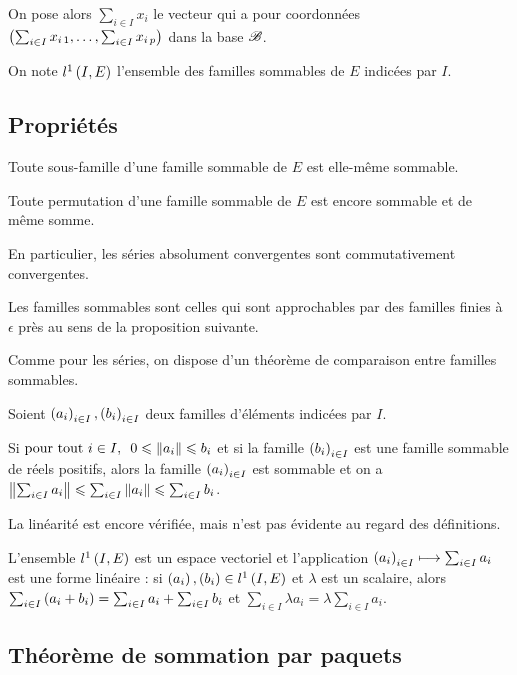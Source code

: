 On pose alors \(\sum_{i\in I}x_i\) le vecteur qui a pour coordonnées \(\left(\sum_{i\in I}x_{i\,1},\dots,\sum_{i\in I}x_{i\,p}\right)\) dans la base \(\mathscr{B}\).

On note \(l^1\left(I,E\right)\) l'ensemble des familles sommables de \(E\) indicées par \(I\).

\subsection{Propriétés}

\begin{prop}
Toute sous-famille d'une famille sommable de \(E\) est elle-même sommable.

Toute permutation d'une famille sommable de \(E\) est encore sommable et de même somme.
\end{prop}

En particulier, les séries absolument convergentes sont commutativement convergentes.

Les familles sommables sont celles qui sont approchables par des familles finies à \(\epsilon\) près au sens de la proposition suivante.

Comme pour les séries, on dispose d'un théorème de comparaison entre familles sommables.

\begin{prop}
Soient \(\left(a_i\right)_{i\in I},\left(b_i\right)_{i\in I}\) deux familles d'éléments indicées par \(I\).

Si \(\quantifs{\tpt i\in I}0\leq\norme{a_i}\leq b_i\) et si la famille \(\left(b_i\right)_{i\in I}\) est une famille sommable de réels positifs, alors la famille \(\left(a_i\right)_{i\in I}\) est sommable et on a \(\norme{\sum_{i\in I}a_i}\leq\sum_{i\in I}\norme{a_i}\leq\sum_{i\in I}b_i\).
\end{prop}

La linéarité est encore vérifiée, mais n'est pas évidente au regard des définitions.

\begin{prop}
L'ensemble \(l^1\left(I,E\right)\) est un espace vectoriel et l'application \(\left(a_i\right)_{i\in I}\longmapsto\sum_{i\in I}a_i\) est une forme linéaire : si \(\left(a_i\right),\left(b_i\right)\in l^1\left(I,E\right)\) et \(\lambda\) est un scalaire, alors \(\sum_{i\in I}\left(a_i+b_i\right)=\sum_{i\in I}a_i+\sum_{i\in I}b_i\) et \(\sum_{i\in I}\lambda a_i=\lambda\sum_{i\in I}a_i\).
\end{prop}

\subsection{Théorème de sommation par paquets}

